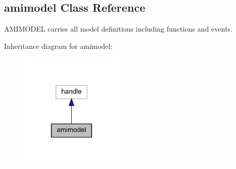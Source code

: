 \hypertarget{classamimodel}{}\subsection{amimodel Class Reference}
\label{classamimodel}


A\+M\+I\+M\+O\+D\+EL carries all model definitions including functions and events.  




Inheritance diagram for amimodel\+:
\nopagebreak
\begin{figure}[H]
\begin{center}
\leavevmode
\includegraphics[width=139pt]{classamimodel__inherit__graph}
\end{center}
\end{figure}
